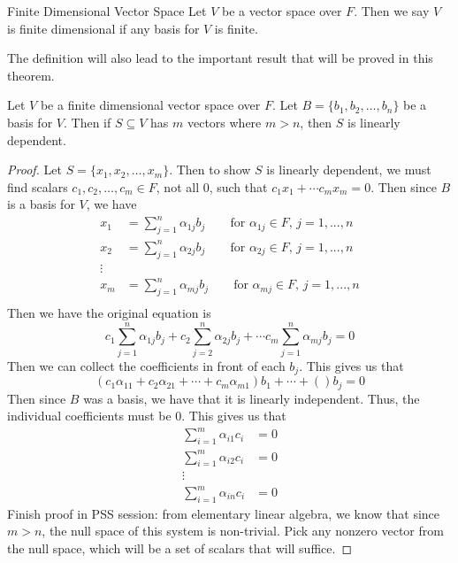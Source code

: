 \documentclass[main.tex]{subfiles}
\begin{document}
    \begin{defn}{Finite Dimensional Vector Space}{}
        Let $V$ be a vector space over $F$. Then we say $V$ is finite dimensional if any basis for $V$ is finite. 
    \end{defn}
    The definition will also lead to the important result that will be proved in this theorem. 
    \begin{thrm}{}{}
        Let $V$ be a finite dimensional vector space over $F$. Let $B = \{b_1, b_2, \dots, b_n\}$ be a basis for $V$. Then if $S \subseteq V$ has $m$ vectors where $m > n$, then $S$ is linearly dependent. 
    \end{thrm}
    \begin{proof}
        Let $S = \{x_1, x_2, \dots, x_m\}$. Then to show $S$ is linearly dependent, we must find scalars $c_1, c_2, \dots, c_m \in F$, not all 0, such that $c_1x_1 + \cdots c_mx_m = 0$. Then since $B$ is a basis for $V$, we have 
        \begin{equation}
            \begin{aligned}
                x_1 &= \sum_{j = 1}^n \alpha_{1j}b_j \qquad \text{for $\alpha_{1j}\in F$, $j = 1, ..., n$} \\
                x_2 &= \sum_{j = 1}^n \alpha_{2j}b_j \qquad \text{for $\alpha_{2j}\in F$, $j = 1, ..., n$} \\
                \vdots \\
                x_m &= \sum_{j = 1}^n \alpha_{mj}b_j \qquad \text{for $\alpha_{mj}\in F$, $j = 1, ..., n$} \\
            \end{aligned}  
        \end{equation}
        Then we have the original equation is 
        \begin{equation}
            c_1\sum_{j=1}^n \alpha_{1j}b_j + c_2 \sum_{j = 2}^n \alpha_{2j}b_j + \cdots c_m \sum_{j = 1}^n \alpha_{mj}b_j = 0
        \end{equation}
        Then we can collect the coefficients in front of each $b_j$. This gives us that 
        \begin{equation}
            (c_1\alpha_{11} + c_2\alpha_{21} + \cdots + c_m\alpha_{m1})b_1 + \cdots + ()b_j = 0
        \end{equation}
        Then since $B$ was a basis, we have that it is linearly independent. Thus, the individual coefficients must be 0. This gives us that 
        \begin{equation}
            \begin{aligned}
                \sum_{i = 1}^m \alpha_{i1}c_i &= 0 \\
                \sum_{i = 1}^m \alpha_{i2}c_i &= 0 \\
                \vdots \\
                \sum_{i = 1}^m \alpha_{in}c_i &= 0
            \end{aligned}
        \end{equation}
        Finish proof in PSS session: from elementary linear algebra, we know that since $m>n$, the null space of this system is non-trivial. Pick any nonzero vector from the null space, which will be a set of scalars that will suffice. 
    \end{proof}
\end{document}
